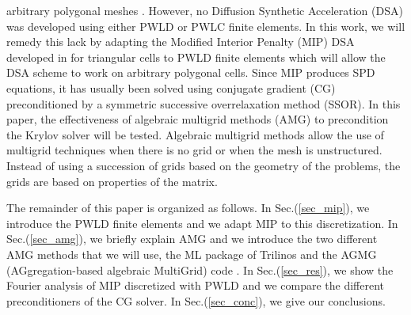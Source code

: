 arbitrary polygonal meshes \cite{pwl_diffusion}. However, no Diffusion
Synthetic Acceleration (DSA) \cite{dsa_ref,larsen_dsa,consistent_p1,mip} was 
developed using either PWLD or PWLC finite elements. In this work, we will 
remedy this lack by adapting the Modified Interior Penalty (MIP) DSA developed 
in \cite{mip} for triangular cells to PWLD finite elements which will allow 
the DSA scheme to work on arbitrary polygonal cells. Since MIP produces SPD 
equations, it has usually been solved using conjugate gradient (CG) preconditioned 
by a symmetric successive overrelaxation method (SSOR). In this
paper, the effectiveness of algebraic multigrid methods (AMG) to precondition 
the Krylov solver \cite{amg,amg_course} will be tested. Algebraic multigrid methods 
allow the use of multigrid techniques when there is no grid or when the mesh is 
unstructured. Instead of using a succession of grids based on the geometry of the 
problems, the grids are based on properties of the matrix.

The remainder of this paper is organized as follows. In Sec.(\ref{sec_mip}),
we introduce the PWLD finite elements and we adapt MIP to this discretization. 
In Sec.(\ref{sec_amg}), we briefly explain AMG and we introduce the two different 
AMG methods that we will use, the ML package of Trilinos \cite{ml_guide} and the 
AGMG (AGgregation-based algebraic MultiGrid) code \cite{agmg_guide}. In 
Sec.(\ref{sec_res}), we show the Fourier analysis of MIP discretized with PWLD
and we compare the different preconditioners of the CG solver. In 
Sec.(\ref{sec_conc}), we give our conclusions.
